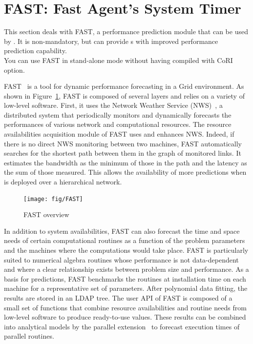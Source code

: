 \section{FAST: Fast Agent's System Timer}
\label{sec:FAST}

This section deals with FAST, a performance prediction module that can be used
by \diet. It is non-mandatory, but can provide {\sed}s with improved
performance prediction capability.\\ You can use FAST in stand-alone mode
without having compiled with CoRI option.

FAST~\cite{Qui02} is a tool for dynamic performance forecasting in a Grid
environment. As shown in Figure~\ref{fig:fast-overview}, FAST is composed of
several layers and relies on a variety of low-level software. First, it uses
the Network Weather Service (NWS)~\cite{WSH99}, a distributed system that
periodically monitors and dynamically forecasts the performances of various
network and computational resources. The resource availabilities acquisition
module of FAST uses and enhances NWS. Indeed, if there is no direct NWS
monitoring between two machines, FAST automatically searches for the shortest
path between them in the graph of monitored links. It estimates the bandwidth
as the minimum of those in the path and the latency as the sum of those
measured. This allows the availability of more predictions when \diet is
deployed over a hierarchical network.

\begin{figure}[htb]
  \begin{center}
    \texttt{[image: fig/FAST]}
    \caption{FAST overview}
    \label{fig:fast-overview}
  \end{center}
\end{figure}

In addition to system availabilities, FAST can also forecast the time and space
needs of certain computational routines as a function of the problem parameters
and the machines where the computations would take place.  FAST is particularly
suited to numerical algebra routines whose performance is not data-dependent
and where a clear relationship exists between problem size and performance. As
a basis for predictions, FAST benchmarks the routines at installation time on
each machine for a representative set of parameters. After polynomial data
fitting, the results are stored in an LDAP tree. The user API of FAST is
composed of a small set of functions that combine resource availabilities and
routine needs from low-level software to produce ready-to-use values.  These
results can be combined into analytical models by the parallel
extension~\cite{CS02} to forecast execution times of parallel routines.

